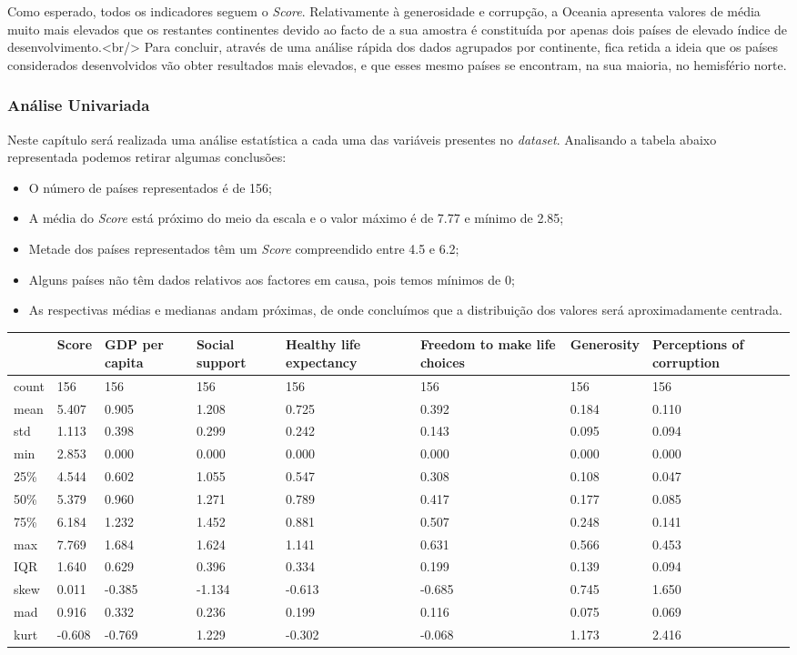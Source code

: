 \documentclass[]{article}
\begin{document}
Como esperado, todos os indicadores seguem o \emph{Score}. Relativamente
à generosidade e corrupção, a Oceania apresenta valores de média muito
mais elevados que os restantes continentes devido ao facto de a sua
amostra é constituída por apenas dois países de elevado índice de
desenvolvimento.\textless{}br/\textgreater{} Para concluir, através de
uma análise rápida dos dados agrupados por continente, fica retida a
ideia que os países considerados desenvolvidos vão obter resultados mais
elevados, e que esses mesmo países se encontram, na sua maioria, no
hemisfério norte.

\hypertarget{header-n14}{%
\subsubsection{Análise Univariada}\label{header-n14}}

Neste capítulo será realizada uma análise estatística a cada uma das
variáveis presentes no \emph{dataset}. Analisando a tabela abaixo
representada podemos retirar algumas conclusões:

\begin{itemize}
\item
  O número de países representados é de 156;
\item
  A média do \emph{Score} está próximo do meio da escala e o valor
  máximo é de 7.77 e mínimo de 2.85;
\item
  Metade dos países representados têm um \emph{Score} compreendido entre
  4.5 e 6.2;
\item
  Alguns países não têm dados relativos aos factores em causa, pois
  temos mínimos de 0;
\item
  As respectivas médias e medianas andam próximas, de onde concluímos
  que a distribuição dos valores será aproximadamente centrada.
\end{itemize}

\begin{longtable}[]{@{}llllllll@{}}
\toprule
& Score & GDP per capita & Social support & Healthy life expectancy &
Freedom to make life choices & Generosity & Perceptions of
corruption\tabularnewline
\midrule
\endhead
count & 156 & 156 & 156 & 156 & 156 & 156 & 156\tabularnewline
mean & 5.407 & 0.905 & 1.208 & 0.725 & 0.392 & 0.184 &
0.110\tabularnewline
std & 1.113 & 0.398 & 0.299 & 0.242 & 0.143 & 0.095 &
0.094\tabularnewline
min & 2.853 & 0.000 & 0.000 & 0.000 & 0.000 & 0.000 &
0.000\tabularnewline
25\% & 4.544 & 0.602 & 1.055 & 0.547 & 0.308 & 0.108 &
0.047\tabularnewline
50\% & 5.379 & 0.960 & 1.271 & 0.789 & 0.417 & 0.177 &
0.085\tabularnewline
75\% & 6.184 & 1.232 & 1.452 & 0.881 & 0.507 & 0.248 &
0.141\tabularnewline
max & 7.769 & 1.684 & 1.624 & 1.141 & 0.631 & 0.566 &
0.453\tabularnewline
IQR & 1.640 & 0.629 & 0.396 & 0.334 & 0.199 & 0.139 &
0.094\tabularnewline
skew & 0.011 & -0.385 & -1.134 & -0.613 & -0.685 & 0.745 &
1.650\tabularnewline
mad & 0.916 & 0.332 & 0.236 & 0.199 & 0.116 & 0.075 &
0.069\tabularnewline
kurt & -0.608 & -0.769 & 1.229 & -0.302 & -0.068 & 1.173 &
2.416\tabularnewline
\bottomrule
\end{longtable}
\end{document}
